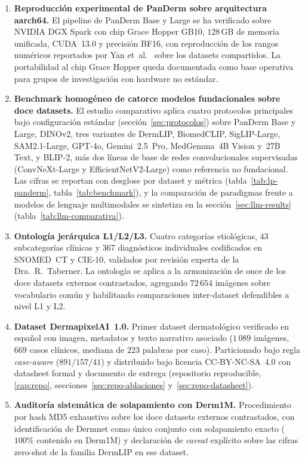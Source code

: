 \begin{enumerate}
\item \textbf{Reproducción experimental de PanDerm sobre
arquitectura aarch64.} El pipeline de PanDerm Base y Large se ha
verificado sobre NVIDIA DGX Spark con chip Grace Hopper GB10,
$128$\,GB de memoria unificada, CUDA~13.0 y precisión BF16, con
reproducción de los rangos numéricos reportados por
Yan et~al.~\cite{panderm2025} sobre los datasets compartidos. La
portabilidad al chip Grace Hopper queda documentada como base
operativa para grupos de investigación con hardware no estándar.

\item \textbf{Benchmark homogéneo de catorce modelos fundacionales
sobre doce datasets.} El estudio comparativo aplica cuatro
protocolos principales bajo configuración estándar
(sección~\ref{sec:protocolos}) sobre PanDerm Base y Large, DINOv2,
tres variantes de DermLIP, BiomedCLIP, SigLIP-Large, SAM2.1-Large,
GPT-4o, Gemini~2.5~Pro, MedGemma~4B Vision y~27B Text, y BLIP-2, más
dos líneas de base de redes convolucionales supervisadas
(ConvNeXt-Large y EfficientNetV2-Large) como referencia no
fundacional. Las cifras se reportan
con desglose por dataset y métrica
(tabla~\ref{tab:lp-panderm}, tabla~\ref{tab:benchmark}), y la
comparación de paradigmas frente a modelos de lenguaje multimodales se
sintetiza en la sección~\ref{sec:llm-results}
(tabla~\ref{tab:llm-comparativa}).

\item \textbf{Ontología jerárquica L1/L2/L3.} Cuatro categorías
etiológicas, $43$ subcategorías clínicas y $367$
diagnósticos individuales codificados en SNOMED~CT y CIE-10,
validados por revisión experta de la Dra.~R.~Taberner. La
ontología se aplica a la armonización de once de los doce
datasets externos contrastados, agregando $72\,654$ imágenes
sobre vocabulario común y habilitando comparaciones inter-dataset
defendibles a nivel L1 y L2.

\item \textbf{Dataset DermapixelAI~1.0.} Primer dataset
dermatológico verificado en español con imagen, metadatos y texto
narrativo asociado ($1\,089$ imágenes, $669$ casos clínicos,
mediana de $223$ palabras por caso). Particionado bajo regla
\emph{case-aware} ($891 / 157 / 41$) y distribuido bajo
licencia CC-BY-NC-SA~4.0 con datasheet formal
y documento de entrega (repositorio reproducible, \ref{cap:repo},
secciones~\ref{sec:repo-ablaciones} y~\ref{sec:repo-datasheet}).

\item \textbf{Auditoría sistemática de solapamiento con Derm1M.}
Procedimiento por hash MD5 exhaustivo sobre los doce datasets
externos contrastados, con identificación de Dermnet como único
conjunto con solapamiento exacto ($100\%$ contenido en Derm1M) y
declaración de \emph{caveat} explícito sobre las cifras zero-shot de
la familia DermLIP en ese dataset.


\end{enumerate}
